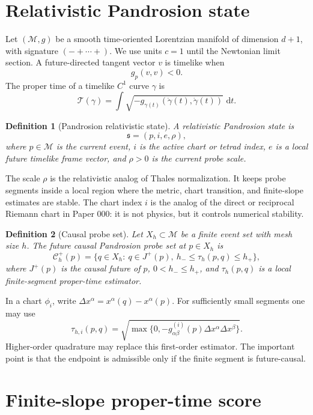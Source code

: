 \documentclass[11pt]{article}
\newtheorem{definition}{Definition}[section]
\newcommand{\M}{\mathcal M}
\newcommand{\Cset}{\mathcal C}
\newcommand{\T}{\mathcal T}
\newcommand{\dd}{\,\mathrm d}
\begin{document}
\section{Relativistic Pandrosion state}

Let \((\M,g)\) be a smooth time-oriented Lorentzian manifold of dimension
\(d+1\), with signature \((-+\cdots+)\).  We use units \(c=1\) until the
Newtonian limit section.  A future-directed tangent vector \(v\) is timelike
when
\[
        g_p(v,v)<0.
\]
The proper time of a timelike \(C^1\) curve \(\gamma\) is
\[
        \T(\gamma)
        =
        \int\sqrt{-g_{\gamma(t)}(\dot\gamma(t),\dot\gamma(t))}\,\dd t.
\]

\begin{definition}[Pandrosion relativistic state]
A relativistic Pandrosion state is
\[
        \mathfrak s=(p,i,e,\rho),
\]
where \(p\in\M\) is the current event, \(i\) is the active chart or tetrad
index, \(e\) is a local future timelike frame vector, and \(\rho>0\) is the
current probe scale.
\end{definition}

The scale \(\rho\) is the relativistic analog of Thales normalization.  It
keeps probe segments inside a local region where the metric, chart transition,
and finite-slope estimates are stable.  The chart index \(i\) is the analog of
the direct or reciprocal Riemann chart in Paper 000: it is not physics, but it
controls numerical stability.

\begin{definition}[Causal probe set]
Let \(X_h\subset\M\) be a finite event set with mesh size \(h\).  The future
causal Pandrosion probe set at \(p\in X_h\) is
\[
        \Cset_h^+(p)
        =
        \{q\in X_h:\ q\in J^+(p),\ h_-\le \tau_h(p,q)\le h_+\},
\]
where \(J^+(p)\) is the causal future of \(p\), \(0<h_-\le h_+\), and
\(\tau_h(p,q)\) is a local finite-segment proper-time estimator.
\end{definition}

In a chart \(\phi_i\), write \(\Delta x^\alpha=x^\alpha(q)-x^\alpha(p)\).
For sufficiently small segments one may use
\[
        \tau_{h,i}(p,q)
        =
        \sqrt{\max\{0,-g^{(i)}_{\alpha\beta}(p)\Delta x^\alpha\Delta x^\beta\}}.
\]
Higher-order quadrature may replace this first-order estimator.  The important
point is that the endpoint is admissible only if the finite segment is
future-causal.

\section{Finite-slope proper-time score}
\end{document}
